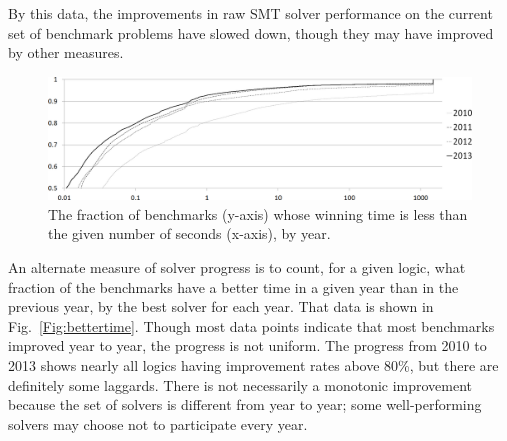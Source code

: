 \documentclass[smallcondensed]{svjour3}
\begin{document}
By this data, the improvements in raw SMT solver performance on the current set of benchmark problems have slowed down, though they may have improved by other measures.

\begin{figure}
\centering
\includegraphics[width=.95\textwidth]{CumulativeTimes}
\caption{The fraction of benchmarks (y-axis) whose winning time is less than the given number of seconds (x-axis), by year.}
\label{Fig:CumulativeTimes}
\end{figure}

An alternate measure of solver progress is to count, for a given logic, what fraction of the benchmarks have a better time in a given year than in the previous year, by the best solver for each year. That data is shown in Fig.~\ref{Fig:bettertime}. Though most data points indicate that most benchmarks improved year to year, the progress is not uniform. The progress from 2010 to 2013 shows nearly all logics having improvement rates above 80\%, but there are definitely some laggards. There is not necessarily a monotonic improvement because the set of solvers is different from year to year; some well-performing solvers may choose not to participate every year.
\end{document}
